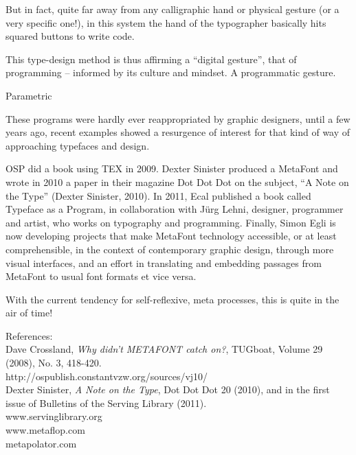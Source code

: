 \documentclass[danish,a2paper,22pt]{scrartcl}
\begin{document}
\begin{multicols*}{3}
\begin{spacing}{1.1}
But in fact, quite far away from any calligraphic hand or physical gesture (or a very specific one!), in this system the hand of the typographer basically hits squared buttons to write code.\par
This type-design method is thus affirming a “digital gesture”, that of programming -- informed by its culture and mindset. A programmatic gesture.\par
Parametric\par
These programs were hardly ever reappropriated by graphic designers, until a few years ago, recent examples showed a resurgence of interest for that kind of way of approaching typefaces and design. \par
OSP did a book using TEX in 2009. Dexter Sinister produced a MetaFont and wrote in 2010 a paper in their magazine Dot Dot Dot on the subject, “A Note on the Type” (Dexter Sinister, 2010). In 2011, Ecal published a book called Typeface as a Program, in collaboration with Jürg Lehni, designer, programmer and artist, who works on typography and programming. Finally, Simon Egli is now developing projects that make MetaFont technology accessible, or at least comprehensible, in the context of contemporary graphic design, through more visual interfaces, and an effort in translating and embedding passages from MetaFont to usual font formats et vice versa.\par
With the current tendency for self-reflexive, meta processes, this is quite in the air of time!\\ 
\par
References:\\
Dave Crossland, {\it Why didn't METAFONT catch on?}, TUGboat, Volume 29 (2008), No. 3, 418-420.\\
http://ospublish.constantvzw.org/\linebreak sources/vj10/\\
Dexter Sinister, {\it A Note on the Type}, Dot Dot Dot 20 (2010), and in the first issue of Bulletins of the Serving Library (2011).\\
www.servinglibrary.org\\
www.metaflop.com\\
metapolator.com

\end{spacing}
\end{multicols*}
\end{document}
